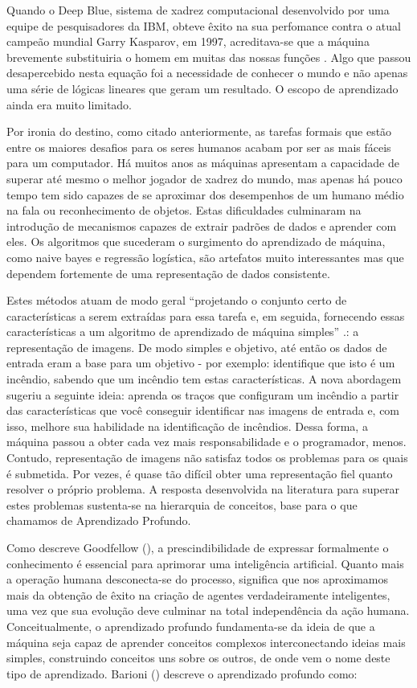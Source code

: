Quando o Deep Blue, sistema de xadrez computacional desenvolvido por uma equipe de pesquisadores da IBM, obteve êxito na sua perfomance contra o atual campeão mundial Garry Kasparov, em 1997, acreditava-se que a máquina brevemente substituiria o homem em muitas das nossas funções \cite{deepblue02}. Algo que passou desapercebido nesta equação foi a necessidade de conhecer o mundo e não apenas uma série de lógicas lineares que geram um resultado. O escopo de aprendizado ainda era muito limitado.

Por ironia do destino, como citado anteriormente, as tarefas formais que estão entre os maiores desafios para os seres humanos acabam por ser as mais fáceis para um computador. Há muitos anos as máquinas apresentam a capacidade de superar até mesmo o melhor jogador de xadrez do mundo, mas apenas há pouco tempo tem sido capazes de se aproximar dos desempenhos de um humano médio na fala ou reconhecimento de objetos. Estas dificuldades culminaram na introdução de mecanismos capazes de extrair padrões de dados e aprender com eles. Os algoritmos que sucederam o surgimento do aprendizado de máquina, como naive bayes e regressão logística, são artefatos muito interessantes mas que dependem fortemente de uma representação de dados consistente.

Estes métodos atuam de modo geral ``projetando o conjunto certo de características a serem extraídas para essa tarefa e, em seguida, fornecendo essas características a um algoritmo de aprendizado de máquina simples'' \cite[p.3]{goodfellow16}.: a representação de imagens. De modo simples e objetivo, até então os dados de entrada eram a base para um objetivo - por exemplo: identifique que isto é um incêndio, sabendo que um incêndio tem estas características. A nova abordagem sugeriu a seguinte ideia: aprenda os traços que configuram um incêndio a partir das características que você conseguir identificar nas imagens de entrada e, com isso, melhore sua habilidade na identificação de incêndios. Dessa forma, a máquina passou a obter cada vez mais responsabilidade e o programador, menos. Contudo, representação de imagens não satisfaz todos os problemas para os quais é submetida. Por vezes, é quase tão difícil obter uma representação fiel quanto resolver o próprio problema. A resposta desenvolvida na literatura para superar estes problemas sustenta-se na hierarquia de conceitos, base para o que chamamos de Aprendizado Profundo.

Como descreve Goodfellow (\citeyear{goodfellow16}), a prescindibilidade de expressar formalmente o conhecimento é essencial para aprimorar uma inteligência artificial. Quanto mais a operação humana desconecta-se do processo, significa que nos aproximamos mais da obtenção de êxito na criação de agentes verdadeiramente inteligentes, uma vez que sua evolução deve culminar na total independência da ação humana. Conceitualmente, o aprendizado profundo fundamenta-se da ideia de que a máquina seja capaz de aprender conceitos complexos interconectando ideias mais simples, construindo conceitos uns sobre os outros, de onde vem o nome deste tipo de aprendizado. Barioni (\citeyear{Barioni17}) descreve o aprendizado profundo como:

